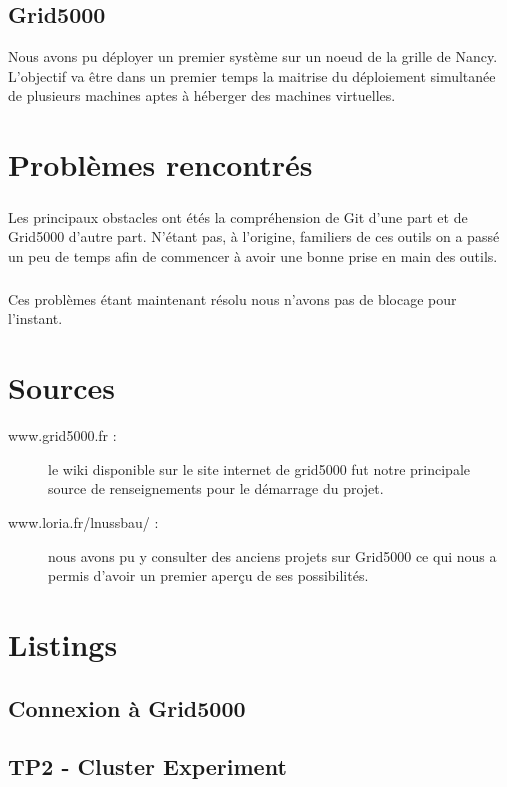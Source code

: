 \documentclass{article}
\begin{document}
\section{Grid5000}
Nous avons pu déployer un premier système sur un noeud de la grille de Nancy.
L'objectif va être dans un premier temps la maitrise du déploiement simultanée de plusieurs machines aptes à héberger des machines virtuelles.
\chapter{Problèmes rencontrés}
\paragraph{}
Les principaux obstacles ont étés la compréhension de Git d'une part et de Grid5000 d'autre part. N'étant pas, à l'origine, familiers de ces outils on a passé un peu de temps afin de commencer à avoir une bonne prise en main des outils.
\paragraph{}
Ces problèmes étant maintenant résolu nous n'avons pas de blocage pour l'instant.
\appendix
\chapter{Sources}
\begin{description}
\item[www.grid5000.fr : ]le wiki disponible sur le site internet de grid5000 fut notre principale source de renseignements pour le démarrage du projet.
\item[www.loria.fr/lnussbau/ : ]nous avons pu y consulter des anciens projets sur Grid5000 ce qui nous a permis d'avoir un premier aperçu de ses possibilités.
\end{description}
\chapter{Listings}
\section{Connexion à Grid5000}

\section{TP2 - Cluster Experiment}

\end{document}
